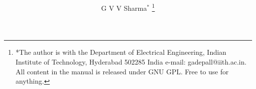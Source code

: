 \documentclass[journal,12pt,twocolumn]{IEEEtran}
\begin{document}

\def\putbox#1#2#3{\makebox[0in][l]{\makebox[#1][l]{}\raisebox{\baselineskip}[0in][0in]{\raisebox{#2}[0in][0in]{#3}}}}
     \def\rightbox#1{\makebox[0in][r]{#1}}
     \def\centbox#1{\makebox[0in]{#1}}
     \def\topbox#1{\raisebox{-\baselineskip}[0in][0in]{#1}}
     \def\midbox#1{\raisebox{-0.5\baselineskip}[0in][0in]{#1}}

\vspace{3cm}

\title{ 
}


%
%
%

\author{G V V Sharma$^{*}$ %
\thanks{*The author is with the Department
of Electrical Engineering, Indian Institute of Technology, Hyderabad
502285 India e-mail:  gadepall@iith.ac.in. All content in the manual is released under GNU GPL.  Free to use for anything.}%
}
% 
%
\end{document}
